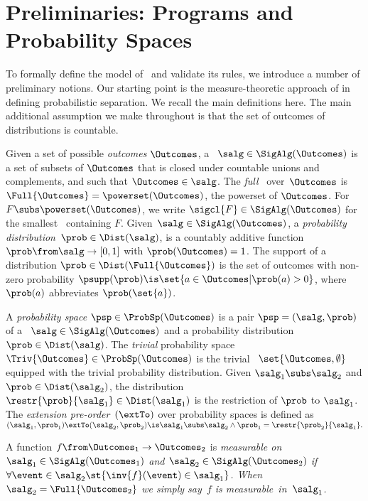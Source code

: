 \section{Preliminaries: Programs and Probability Spaces}
\label{sec:prelims}

To formally define the model of \thelogic\ and validate its rules,
we introduce a number of preliminary notions.
Our starting point is the measure-theoretic approach of
\cite{lilac} in defining probabilistic separation.
We recall the main definitions here.
The main additional assumption we make throughout
is that the set of outcomes of distributions is countable.


\begin{definition}
\label{def:prob-sp}
  Given a set of possible \emph{outcomes} $\Outcomes$,
  a \salgebra\ $ \salg \in \SigAlg(\Outcomes) $ is
  a set of subsets of $\Outcomes$
    that is closed under countable unions and
    complements, and such that
    $\Outcomes \in \salg$.
  The \emph{full} \salgebra\ over~$\Outcomes$ is
  $ \Full{\Outcomes} = \powerset(\Outcomes) $,
		the powerset of $\Outcomes$.
  For $F \subs \powerset(\Outcomes)$, we write $\sigcl{F} \in \SigAlg(\Outcomes)$
    for the smallest \salgebra\ containing $F$.
Given~$\salg \in \SigAlg(\Outcomes)$,
  a \emph{probability distribution}~$\prob \in \Dist(\salg)$,
    is a countably additive function~$ \prob \from \salg \to [0,1] $
    with $\prob(\Outcomes)=1$.
  The support of a distribution $\prob \in \Dist(\Full{\Outcomes})$
  is the set of outcomes with non-zero probability
  $ \psupp(\prob) \is \set{ a \in \Outcomes | \prob(a) > 0 } $,
  where $\prob(a)$ abbreviates $\prob(\set{a})$.

  A \emph{probability space} $ \psp \in \ProbSp(\Outcomes) $ is
  a pair $ \psp = (\salg, \prob) $ of
    a \salgebra\ $\salg \in \SigAlg(\Outcomes)$ and
    a probability distribution~$\prob \in \Dist(\salg)$.
The \emph{trivial} probability space $\Triv{\Outcomes} \in \ProbSp(\Outcomes)$
  is the trivial \salgebra\ $ \set{\Outcomes,\emptyset} $
  equipped with the trivial probability distribution.
Given $\salg_1 \subs \salg_2$ and $\prob \in \Dist(\salg_2)$,
  the distribution $ \restr{\prob}{\salg_1} \in \Dist(\salg_1) $
  is the restriction of $\prob$ to $\salg_1$.
The \emph{extension pre-order}~$(\extTo)$ over probability spaces is defined as
  $
    (\salg_1, \prob_1) \extTo (\salg_2, \prob_2) \is
      \salg_1 \subs \salg_2 \land \prob_1 = \restr{\prob_2}{\salg_1}.
  $

  A function $f \from \Outcomes_1 \to \Outcomes_2$ is
  \em{measurable} on
  $ \salg_1\in\SigAlg(\Outcomes_1)$ and $\salg_2\in\SigAlg(\Outcomes_2) $
  if\/
  $ \forall \event \in \salg_2 \st {\inv{f}(\event) \in \salg_1} $.
When $\salg_2 = \Full{\Outcomes_2}$
	we simply say~$f$ is measurable~in~$\salg_1$.
\end{definition}

